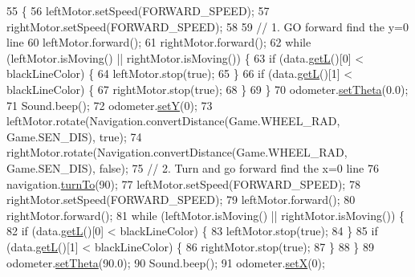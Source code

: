 \begin{DoxyCode}
55                                                   \{
56     leftMotor.setSpeed(FORWARD\_SPEED);
57     rightMotor.setSpeed(FORWARD\_SPEED);
58 
59     \textcolor{comment}{// 1. GO forward find the y=0 line}
60     leftMotor.forward();
61     rightMotor.forward();
62     \textcolor{keywordflow}{while} (leftMotor.isMoving() || rightMotor.isMoving()) \{
63       \textcolor{keywordflow}{if} (data.\hyperlink{classca_1_1mcgill_1_1ecse211_1_1threads_1_1_sensor_data_a39eec50582f0e4bcff8a4669c48e1609}{getL}()[0] < blackLineColor) \{
64         leftMotor.stop(\textcolor{keyword}{true});
65       \}
66       \textcolor{keywordflow}{if} (data.\hyperlink{classca_1_1mcgill_1_1ecse211_1_1threads_1_1_sensor_data_a39eec50582f0e4bcff8a4669c48e1609}{getL}()[1] < blackLineColor) \{
67         rightMotor.stop(\textcolor{keyword}{true});
68       \}
69     \}
70     odometer.\hyperlink{classca_1_1mcgill_1_1ecse211_1_1odometer_1_1_odometer_data_a419b8f07c2c5374411c8e62298e9a402}{setTheta}(0.0);
71     Sound.beep();
72     odometer.\hyperlink{classca_1_1mcgill_1_1ecse211_1_1odometer_1_1_odometer_data_a82986438cd462e66520bc62bb4bd2b75}{setY}(0);
73     leftMotor.rotate(Navigation.convertDistance(Game.WHEEL\_RAD, Game.SEN\_DIS), \textcolor{keyword}{true});
74     rightMotor.rotate(Navigation.convertDistance(Game.WHEEL\_RAD, Game.SEN\_DIS), \textcolor{keyword}{false});
75     \textcolor{comment}{// 2. Turn and go forward find the x=0 line}
76     navigation.\hyperlink{classca_1_1mcgill_1_1ecse211_1_1project_1_1_navigation_a3bbe0645f2b3b3d0986b4a707fb5a00c}{turnTo}(90);
77     leftMotor.setSpeed(FORWARD\_SPEED);
78     rightMotor.setSpeed(FORWARD\_SPEED);
79     leftMotor.forward();
80     rightMotor.forward();
81     \textcolor{keywordflow}{while} (leftMotor.isMoving() || rightMotor.isMoving()) \{
82       \textcolor{keywordflow}{if} (data.\hyperlink{classca_1_1mcgill_1_1ecse211_1_1threads_1_1_sensor_data_a39eec50582f0e4bcff8a4669c48e1609}{getL}()[0] < blackLineColor) \{
83         leftMotor.stop(\textcolor{keyword}{true});
84       \}
85       \textcolor{keywordflow}{if} (data.\hyperlink{classca_1_1mcgill_1_1ecse211_1_1threads_1_1_sensor_data_a39eec50582f0e4bcff8a4669c48e1609}{getL}()[1] < blackLineColor) \{
86         rightMotor.stop(\textcolor{keyword}{true});
87       \}
88     \}
89     odometer.\hyperlink{classca_1_1mcgill_1_1ecse211_1_1odometer_1_1_odometer_data_a419b8f07c2c5374411c8e62298e9a402}{setTheta}(90.0);
90     Sound.beep();
91     odometer.\hyperlink{classca_1_1mcgill_1_1ecse211_1_1odometer_1_1_odometer_data_a2911d7215e47f3064defe016b46bfeef}{setX}(0);

\end{DoxyCode}
